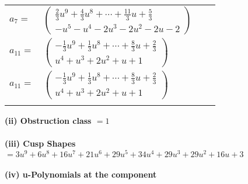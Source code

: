 \documentclass[1p]{elsarticle_modified}
\theoremstyle{definition}
\begin{document}
\begin{tabular}{m{7pt} m{180pt} m{7pt} m{180pt} }
\flushright $a_{7}=$&$\begin{pmatrix}\frac{2}{3} u^9+\frac{4}{3} u^8+\cdots+\frac{11}{3} u+\frac{5}{3}\\- u^5- u^4-2 u^3-2 u^2-2 u-2\end{pmatrix}$ \\
\flushright $a_{11}=$&$\begin{pmatrix}-\frac{1}{3} u^9+\frac{1}{3} u^8+\cdots+\frac{8}{3} u+\frac{2}{3}\\u^4+u^3+2 u^2+u+1\end{pmatrix}$\\ \flushright $a_{11}=$&$\begin{pmatrix}-\frac{1}{3} u^9+\frac{1}{3} u^8+\cdots+\frac{8}{3} u+\frac{2}{3}\\u^4+u^3+2 u^2+u+1\end{pmatrix}$\\&\end{tabular}
\flushleft \textbf{(ii) Obstruction class $= 1$}\\~\\
\flushleft \textbf{(iii) Cusp Shapes $= 3 u^9+6 u^8+16 u^7+21 u^6+29 u^5+34 u^4+29 u^3+29 u^2+16 u+3$}\\~\\
\newpage\renewcommand{\arraystretch}{1}
\flushleft \textbf{(iv) u-Polynomials at the component}\newline \\
\end{document}
